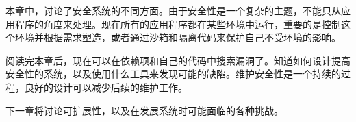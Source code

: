 本章中，讨论了安全系统的不同方面。由于安全性是一个复杂的主题，不能只从应用程序的角度来处理。现在所有的应用程序都在某些环境中运行，重要的是控制这个环境并根据需求塑造，或者通过沙箱和隔离代码来保护自己不受环境的影响。

阅读完本章后，现在可以在依赖项和自己的代码中搜索漏洞了。知道如何设计提高安全性的系统，以及使用什么工具来发现可能的缺陷。维护安全性是一个持续的过程，良好的设计可以减少后续的维护工作。

下一章将讨论可扩展性，以及在发展系统时可能面临的各种挑战。